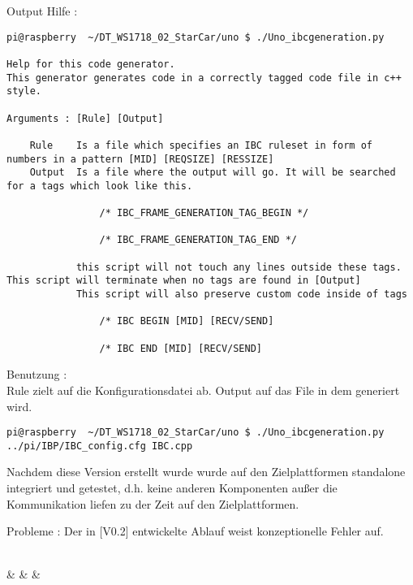 \begin{itemize}
\begin{center}
\begin{center}
Output Hilfe :\\ 
\begin{verbatim}
pi@raspberry  ~/DT_WS1718_02_StarCar/uno $ ./Uno_ibcgeneration.py 

Help for this code generator.
This generator generates code in a correctly tagged code file in c++ style.

Arguments : [Rule] [Output]

    Rule    Is a file which specifies an IBC ruleset in form of numbers in a pattern [MID] [REQSIZE] [RESSIZE]
    Output  Is a file where the output will go. It will be searched for a tags which look like this.
            
                /* IBC_FRAME_GENERATION_TAG_BEGIN */

                /* IBC_FRAME_GENERATION_TAG_END */
            
            this script will not touch any lines outside these tags. This script will terminate when no tags are found in [Output]
            This script will also preserve custom code inside of tags

                /* IBC BEGIN [MID] [RECV/SEND]

                /* IBC END [MID] [RECV/SEND]
\end{verbatim}

Benutzung :\\
Rule zielt auf die Konfigurationsdatei ab.
Output auf das File in dem generiert wird.

\begin{verbatim}
pi@raspberry  ~/DT_WS1718_02_StarCar/uno $ ./Uno_ibcgeneration.py ../pi/IBP/IBC_config.cfg IBC.cpp
\end{verbatim}

Nachdem diese Version erstellt wurde wurde auf den Zielplattformen standalone integriert und getestet, d.h. keine anderen Komponenten außer die Kommunikation liefen zu der Zeit auf den Zielplattformen.


Probleme : Der in [V0.2] entwickelte Ablauf weist konzeptionelle Fehler auf.

\begin{center}
	\begin{bytefield}{32}
		\\
		 &  &  & \\
	\end{bytefield}
\end{center}


\end{center}
\end{center}
\end{itemize}
